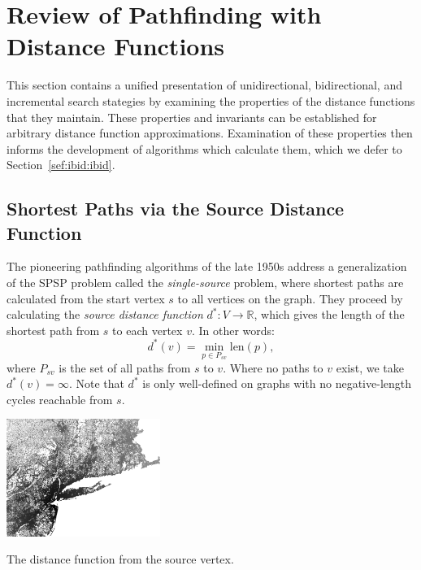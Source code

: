 \section{Review of Pathfinding with Distance Functions}
\label{sec:ibid:distance-functions}

This section contains a unified presentation of unidirectional,
bidirectional, and incremental search stategies
by examining the properties of the distance functions that they
maintain.
These properties and invariants can be established for arbitrary
distance function approximations.
Examination of these properties then informs the development of
algorithms which calculate them,
which we defer to Section~\ref{sef:ibid:ibid}.

\subsection{Shortest Paths via the Source Distance Function}

The pioneering pathfinding algorithms of the late 1950s address
a generalization of the SPSP problem called
the \emph{single-source} problem,
where shortest paths are calculated from the start vertex $s$
to all vertices on the graph.
They proceed by calculating the \emph{source distance function}
$d^* : V \rightarrow \mathbb{R}$,
which gives the length of the shortest path from $s$
to each vertex $v$.
In other words:
\begin{equation}
   d^*(v) = \min_{p \in P_{sv}} \mbox{len}(p),
   \label{eqn:ibid-distance-function-global}
\end{equation}
where $P_{sv}$ is the set of all paths from $s$ to $v$.
Where no paths to $v$ exist,
we take $d^*(v) = \infty$.
Note that $d^*$ is only well-defined on graphs with no negative-length
cycles reachable from $s$.

\begin{marginfigure}%
   \centering%
   \includegraphics[width=5cm]{figs/incbi-road-ne/singleshot/example-dijkstraall.png}%
   \caption{The distance function from the source vertex.}%
   \label{fig:ibid:example-distance-all}%
\end{marginfigure}

